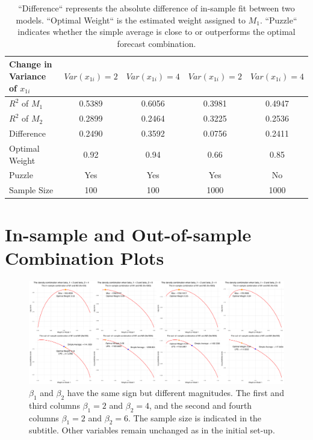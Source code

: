 \documentclass{monashthesis}
\begin{document}
\begin{table}[ht]
  \centering
    \begin{tabular}{l|cccc}
    \toprule
    Change in Variance of $x_{1i}$    &  $Var(x_{1i}) = 2$   &  $Var(x_{1i}) = 4$  &  $Var(x_{1i}) = 2$  &  $Var(x_{1i}) = 4$  \\
    \midrule
    $R^2$ of $M_1$  &    0.5389    &   0.6056   &    0.3981     &   0.4947   \\
    $R^2$ of $M_2$  &    0.2899    &   0.2464   &    0.3225     &   0.2536   \\
    Difference      &    0.2490    &   0.3592   &    0.0756     &   0.2411   \\
    Optimal Weight  &     0.92     &    0.94    &     0.66      &    0.85    \\
    Puzzle          &      Yes     &    Yes     &      Yes      &     No     \\
    Sample Size     &     100      &    100     &     1000      &    1000    \\
    \bottomrule
    \end{tabular}
  \caption{``Difference`` represents the absolute difference of in-sample fit between two models. ``Optimal Weight`` is the estimated weight assigned to $M_1$. ``Puzzle`` indicates whether the simple average is close to or outperforms the optimal forecast combination.}
  \label{tab:regvar}
\end{table}

\hypertarget{plot}{%
\section{In-sample and Out-of-sample Combination Plots}\label{plot}}

\begin{figure}[ht]
\centering
\includegraphics[scale=0.18, angle=90]{backup_figure/betamag11.jpg}
\caption{$\beta_1$ and $\beta_2$ have the same sign but different magnitudes. The first and third columns $\beta_1=2$ and $\beta_2=4$, and the second and fourth columns $\beta_1=2$ and $\beta_2=6$. The sample size is indicated in the subtitle. Other variables remain unchanged as in the initial set-up.}
\label{fig:magnitude}
\end{figure}
\end{document}
